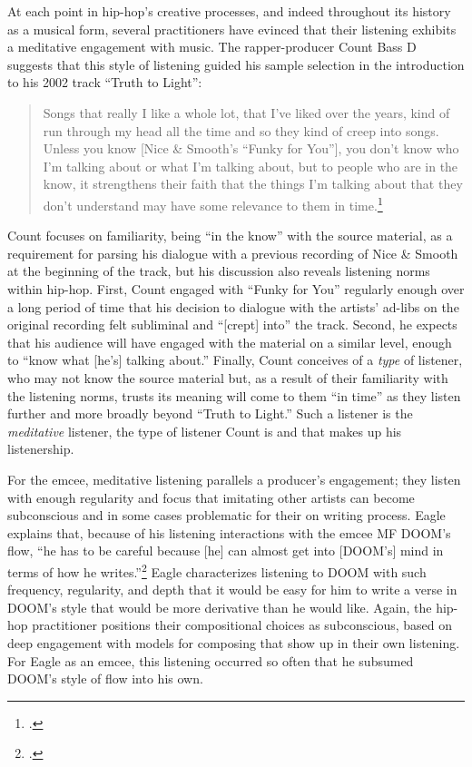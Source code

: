At each point in hip-hop's creative processes, and indeed throughout its history as a musical form, several 
practitioners have evinced that their listening exhibits a meditative engagement with music. The rapper-producer
Count Bass D suggests that this style of listening guided his sample selection in the introduction to his 2002
track ``Truth to Light'': 
    \begin{quote}
        \small Songs that really I like a whole lot, that I've liked over the years, kind of run through my head all
        the time and so they kind of creep into songs. \textellipsis Unless you know [Nice \& Smooth's ``Funky
        for You''], you don't know who I'm talking about or what I'm talking about, but to people who are in
        the know, it strengthens their faith that the things I'm talking about that they don't understand may
        have some relevance to them in time.\footnote{
            \autocite[100]{mickeyhessHipHopDead2007}.}
    \end{quote}
Count focuses on familiarity, being ``in the know'' with the source material, as a requirement for parsing 
his dialogue with a previous recording of Nice \& Smooth at the beginning of the track, but his discussion also
reveals listening norms within hip-hop. First, Count engaged with ``Funky for You'' regularly enough over a long
period of time that his decision to dialogue with the artists' ad-libs on the original recording felt subliminal
and ``[crept] into'' the track. Second, he expects that his audience will have engaged with the material on a 
similar level, enough to ``know what [he's] talking about.'' Finally, Count conceives of a \emph{type} of listener,
who may not know the source material but, as a result of their familiarity with the listening norms, trusts its 
meaning will come to them ``in time'' as they listen further and more broadly beyond ``Truth to Light.'' Such a 
listener is the \emph{meditative} listener, the type of listener Count is and that makes up his listenership.

For the emcee, meditative listening parallels a producer's engagement; they listen with enough regularity and
focus that imitating other artists can become subconscious and in some cases problematic for their on writing
process. Eagle explains that, because of his listening interactions with the emcee MF DOOM's flow, ``he has to
be careful \textellipsis because [he] can almost get into [DOOM's] mind in terms of how he writes.''\footnote{
    \cite{estellecaswellRappingDeconstructedBest2016}.} 
Eagle characterizes listening to DOOM with such frequency, regularity, and depth that it would be easy for him
to write a verse in DOOM's style that would be more derivative than he would like. Again, the hip-hop practitioner
positions their compositional choices as subconscious, based on deep engagement with models for composing that
show up in their own listening. For Eagle as an emcee, this listening occurred so often that he subsumed DOOM's
style of flow into his own.

